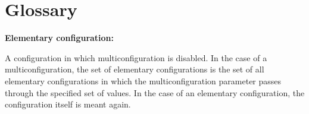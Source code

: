 \documentclass[parskip=full,11pt]{scrartcl}
\begin{document}
\section{Glossary}
\textbf{Elementary configuration:}

A configuration in which multiconfiguration is disabled. In the case of a multiconfiguration, the set of elementary configurations is the set of all elementary configurations in which the multiconfiguration parameter passes through the specified set of values. In the case of an elementary configuration, the configuration itself is meant again.
\end{document}
